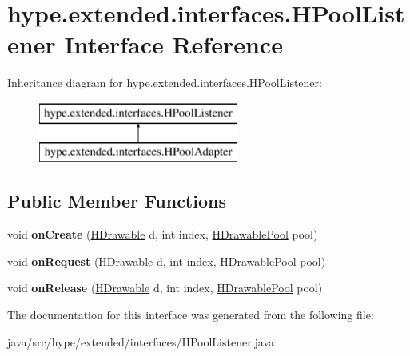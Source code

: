 \hypertarget{interfacehype_1_1extended_1_1interfaces_1_1_h_pool_listener}{\section{hype.\-extended.\-interfaces.\-H\-Pool\-Listener Interface Reference}
\label{interfacehype_1_1extended_1_1interfaces_1_1_h_pool_listener}
}
Inheritance diagram for hype.\-extended.\-interfaces.\-H\-Pool\-Listener\-:\begin{figure}[H]
\begin{center}
\leavevmode
\includegraphics[height=2.000000cm]{interfacehype_1_1extended_1_1interfaces_1_1_h_pool_listener}
\end{center}
\end{figure}
\subsection*{Public Member Functions}
\begin{DoxyCompactItemize}
\item 
\hypertarget{interfacehype_1_1extended_1_1interfaces_1_1_h_pool_listener_a2149538b4a1d341903484a993472a0b5}{void {\bfseries on\-Create} (\hyperlink{classhype_1_1core_1_1drawable_1_1_h_drawable}{H\-Drawable} d, int index, \hyperlink{classhype_1_1extended_1_1util_1_1_h_drawable_pool}{H\-Drawable\-Pool} pool)}\label{interfacehype_1_1extended_1_1interfaces_1_1_h_pool_listener_a2149538b4a1d341903484a993472a0b5}

\item 
\hypertarget{interfacehype_1_1extended_1_1interfaces_1_1_h_pool_listener_a1a6dc13b4b37cf696e980232185b10d2}{void {\bfseries on\-Request} (\hyperlink{classhype_1_1core_1_1drawable_1_1_h_drawable}{H\-Drawable} d, int index, \hyperlink{classhype_1_1extended_1_1util_1_1_h_drawable_pool}{H\-Drawable\-Pool} pool)}\label{interfacehype_1_1extended_1_1interfaces_1_1_h_pool_listener_a1a6dc13b4b37cf696e980232185b10d2}

\item 
\hypertarget{interfacehype_1_1extended_1_1interfaces_1_1_h_pool_listener_a186b8a94c259359cdbab75f4234565db}{void {\bfseries on\-Release} (\hyperlink{classhype_1_1core_1_1drawable_1_1_h_drawable}{H\-Drawable} d, int index, \hyperlink{classhype_1_1extended_1_1util_1_1_h_drawable_pool}{H\-Drawable\-Pool} pool)}\label{interfacehype_1_1extended_1_1interfaces_1_1_h_pool_listener_a186b8a94c259359cdbab75f4234565db}

\end{DoxyCompactItemize}


The documentation for this interface was generated from the following file\-:\begin{DoxyCompactItemize}
\item 
java/src/hype/extended/interfaces/H\-Pool\-Listener.\-java\end{DoxyCompactItemize}
